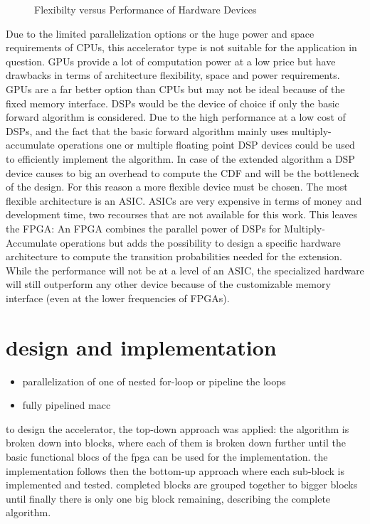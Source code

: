\documentclass[mscthesis]{usiinfthesis}
\begin{document}
\begin{figure}
    \centering
    
    \caption{Flexibilty versus Performance of Hardware Devices}
    \label{fig:hw}
\end{figure}

Due to the limited parallelization options or the huge power and space
requirements of CPUs, this accelerator type is not suitable for the application
in question. GPUs provide a lot of computation power at a low price but have
drawbacks in terms of architecture flexibility, space and power requirements.
GPUs are a far better option than CPUs but may not be ideal because of the
fixed memory interface. DSPs would be the device of choice if only the basic
forward algorithm is considered. Due to the high performance at a low cost of
DSPs, and the fact that the basic forward algorithm mainly uses
multiply-accumulate operations one or multiple floating point DSP devices could
be used to efficiently implement the algorithm. In case of the extended
algorithm a DSP device causes to big an overhead to compute the CDF and will be
the bottleneck of the design. For this reason a more flexible device must be
chosen.  The most flexible architecture is an ASIC. ASICs are very expensive in
terms of money and development time, two recourses that are not available for
this work. This leaves the FPGA: An FPGA combines the parallel power of DSPs
for Multiply-Accumulate operations but adds the possibility to design
a specific hardware architecture to compute the transition probabilities needed
for the extension. While the performance will not be at a level of an ASIC, the
specialized hardware will still outperform any other device because of the
customizable memory interface (even at the lower frequencies of FPGAs).

\chapter{design and implementation}
\label{ch:design}

\begin{itemize}
    \item parallelization of one of nested for-loop or pipeline the loops
    \item fully pipelined macc
\end{itemize}

to design the accelerator, the top-down approach was applied: the algorithm is
broken down into blocks, where each of them is broken down further until the
basic functional blocs of the fpga can be used for the implementation. the
implementation follows then the bottom-up approach where each sub-block is
implemented and tested. completed blocks are grouped together to bigger blocks
until finally there is only one big block remaining, describing the complete
algorithm.
\end{document}
